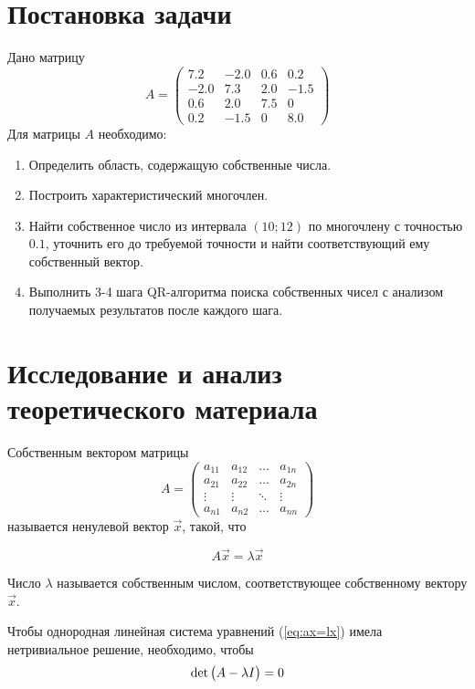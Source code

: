\documentclass[a4paper,12pt,notitlepage,pdftex,headsepline]{scrartcl}
\begin{document}
\section{Постановка задачи}
Дано матрицу
$$A = \left( \begin{matrix}
7.2 & -2.0 & 0.6 & 0.2\\
-2.0 & 7.3 & 2.0 & -1.5\\
0.6 & 2.0 & 7.5 & 0\\
0.2 & -1.5 & 0 & 8.0
\end{matrix}\right)$$
Для матрицы $A$ необходимо:
\begin{enumerate}
\item Определить область, содержащую собственные числа.
\item Построить характеристический многочлен.
\item Найти собственное число из интервала $\left( 10; 12 \right)$ по многочлену с точностью $0.1$, уточнить его до требуемой точности и найти соответствующий ему собственный вектор.
\item Выполнить 3-4 шага QR-алгоритма поиска собственных чисел с анализом получаемых результатов после каждого шага.
\end{enumerate}
\newpage
\section{Исследование и анализ теоретического материала}
Собственным вектором матрицы
$$A = \left(
\begin{matrix}
a_{11} & a_{12} & \hdots & a_{1n}\\
a_{21} & a_{22} & \hdots & a_{2n}\\
\vdots & \vdots & \ddots & \vdots\\
a_{n1} & a_{n2} & \hdots & a_{nn}
\end{matrix}\right)$$
называется ненулевой вектор $\vec{x}$, такой, что

\begin{equation}
\label{eq:ax=lx}
A \vec{x} = \lambda \vec{x}
\end{equation}

Число $\lambda$ называется собственным числом, соответствующее собственному вектору $\vec{x}$.

Чтобы однородная линейная система уравнений (\ref{eq:ax=lx}) имела нетривиальное решение, необходимо, чтобы
\begin{equation}\label{eq:character-eq}
\det\left(\strut A - \lambda I\right) = 0
\end{equation}
\end{document}
